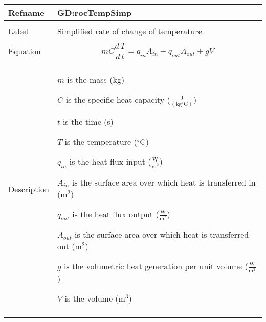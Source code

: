 \documentclass[12pt]{article}
\begin{document}
~\newline
 \noindent \begin{minipage}{\textwidth}
\begin{tabular}{p{} p{}}
\toprule \textbf{Refname} & \textbf{GD:rocTempSimp}
\label{GD:rocTempSimp}
\\ \midrule \\
Label & Simplified rate of change of temperature
        \\ \midrule \\
        Equation & \begin{displaymath}
                   m C \frac{d\,T}{d\,t}={q_{in}} {A_{in}}-{q_{out}} {A_{out}}+g V
                   \end{displaymath}
                   \\ \midrule \\
                   Description & \begin{symbDescription}
                                 \item{$m$ is the mass (kg)}
                                 \item{$C$ is the specific heat capacity ($\frac{\text{J}}{(\text{kg}{}^{\circ}\text{C})}$)}
                                 \item{$t$ is the time (s)}
                                 \item{$T$ is the temperature (${}^{\circ}$C)}
                                 \item{${q_{in}}$ is the heat flux input ($\frac{\text{W}}{\text{m}^{2}}$)}
                                 \item{${A_{in}}$ is the surface area over which heat is transferred in ($\text{m}^{2}$)}
                                 \item{${q_{out}}$ is the heat flux output ($\frac{\text{W}}{\text{m}^{2}}$)}
                                 \item{${A_{out}}$ is the surface area over which heat is transferred out ($\text{m}^{2}$)}
                                 \item{$g$ is the volumetric heat generation per unit volume ($\frac{\text{W}}{\text{m}^{3}}$)}
                                 \item{$V$ is the volume ($\text{m}^{3}$)}
                                 \end{symbDescription}
                                 \\ \midrule \\

\end{tabular}
\end{minipage}
\end{document}
